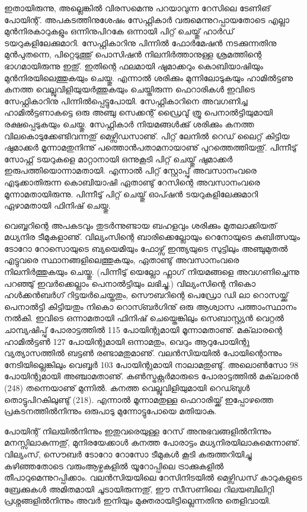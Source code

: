 ഇതായിരുന്നു, അല്ലെങ്കില്‍ വിരസമെന്നു പറയാവുന്ന റേസിലെ ടേണിങ് പോയിന്റ്. അപകടത്തിനുശേഷം സേഫ്റ്റികാര്‍ 
വരുമെന്നുറപ്പായതോടെ എല്ലാ മുന്‍നിരകാറുകളും ഒന്നിനുപിറകേ ഒന്നായി പിറ്റ് ചെയ്തു് ഹാര്‍ഡ് ടയറുകളിലേക്കുമാറി. 
സേഫ്റ്റികാറിനു പിന്നില്‍ ഫോര്‍മേഷന്‍ നടക്കുന്നതിനു മുന്‍പുതന്നെ, പിറ്റെടുത്തു് പൊസിഷന്‍ നിലനിര്‍ത്താനുള്ള 
ശ്രമത്തിന്റെ ഭാഗമായിരുന്നു ഇതു്. ഇതിന്റെ ഫലമായി ഷുമാക്കറും കൊബിയാഷിയും മുന്‍നിരയിലെത്തുകയും ചെയ്തു. 
എന്നാല്‍ ശരിക്കും മുന്നിലോടുകയും ഹാമില്‍ട്ടണു കനത്ത വെല്ലുവിളിയുയര്‍ത്തുകയും ചെയ്തിരുന്ന ഫെറാരികള്‍ ഇവിടെ 
സേഫ്റ്റികാറിനു പിന്നില്‍പ്പെട്ടുപോയി. സേഫ്റ്റികാറിനെ അവഗണിച്ച ഹാമില്‍ട്ടണാകട്ടെ ഒരു അഞ്ചു സെക്കന്റ് ഡ്രൈവു് ത്രൂ 
പെനാല്‍ട്ടിയുമായി രക്ഷപ്പെടുകയും ചെയ്തു. സേഫ്റ്റികാര്‍ നിയമങ്ങള്‍ക്കു് ശരിക്കും കനത്ത വിലകൊടുക്കേണ്ടിവന്നതു് 
മെഴ്സിഡസാണു്. പിറ്റ് ലേനില്‍ റെഡ് ലൈറ്റ് കിട്ടിയ ഷുമാക്കര്‍ മൂന്നാമതുനിന്നു് പത്തൊന്‍പതാമനായാണു് പുറത്തെത്തിയതു്. 
പിന്നീടു് സോഫ്റ്റ് ടയറുകളെ മാറ്റാനായി ഒന്നുകൂടി പിറ്റ് ചെയ്തു് ഷുമാക്കര്‍ ഇരുപത്തിയൊന്നാമതായി. എന്നാല്‍ പിറ്റ് 
സ്റ്റോപ്പു് അവസാനംവരെ എടുക്കാതിരുന്ന കൊബിയാഷി ഏതാണ്ടു് റേസിന്റെ അവസാനംവരെ മൂന്നാമതായിരുന്നു. 
പിന്നീടു് പിറ്റ് ചെയ്തു് ഓപ്ഷന്‍ ടയറുകളിലേക്കുമാറി ഏഴാമതായി ഫിനിഷ് ചെയ്തു.

വെബ്ബറിന്റെ അപകടവും തുടര്‍ന്നുണ്ടായ ബഹളവും ശരിക്കും മുതലാക്കിയത് മധ്യനിര ടീമുകളാണു്. വില്യംസിന്റെ 
ബാരിക്കെല്ലോയും റെനോയുടെ കുബിത്സയും ടോറോ റോസൊയുടെ ബ്യയെമിയും ഫോഴ്സ് ഇന്ത്യയുടെ സുട്ടിലും 
അഞ്ചുമുതല്‍ എട്ടുവരെ സ്ഥാനങ്ങളിലെത്തുകയും, ഏതാണ്ടു് അവസാനംവരെ നിലനിര്‍ത്തുകയും ചെയ്തു. (പിന്നീടു് 
യെല്ലോ ഫ്ലാഗ് നിയമങ്ങളെ അവഗണിച്ചെന്നു പറഞ്ഞു് ഇവര്‍ക്കെല്ലാം പെനാല്‍ട്ടിയും ലഭിച്ചു.) വില്യംസിന്റെ നികൊ 
ഹള്‍ക്കന്‍ബര്‍ഗ് റിട്ടയര്‍ചെയ്തതും, സൌബറിന്റെ പെഡ്രോ ഡി ലാ റൊസയ്ക്കു് പെനാല്‍ട്ടി കിട്ടിയതും നികൊ 
റൊസ്ബര്‍ഗിനു് ഒരു ആശ്വാസ പത്താംസ്ഥാനം നല്‍കി. ഇവിടെ ഒന്നാമതായി ഫിനിഷ് ചെയ്തെങ്കിലും സെബാസ്റ്റ്യന്‍ 
വെറ്റല്‍ ചാമ്പ്യഷിപ്പു് പോരാട്ടത്തില്‍ 115 പോയിന്റുമായി മൂന്നാമതാണു്. മക്‌ലാരന്റെ ഹാമില്‍ട്ടണ്‍ 127 പോയിന്റുമായി 
ഒന്നാമതും, വെറും ആറുപോയിന്റു വ്യത്യാസത്തില്‍ ബട്ടണ്‍ രണ്ടാമതുമാണു്. വലന്‍സിയയില്‍ പോയിന്റൊന്നും 
നേടിയില്ലെങ്കിലും വെബ്ബര്‍ 103 പോയിന്റുമായി നാലാമതുണ്ടു്. അലൊണ്‍സോ 98 പോയിന്റുമായി അഞ്ചാമതാണു്. 
കണ്‍സ്ട്രക്റ്റര്‍മാരുടെ പോരാട്ടത്തില്‍ മക്‌ലാരന്‍ (248) തന്നെയാണു് മുന്നില്‍. കനത്ത വെല്ലുവിളിയുമായി റെഡ്ബുള്‍ 
തൊട്ടുപിറകിലുണ്ടു് (218). എന്നാല്‍ മൂന്നാമതുള്ള ഫെറാരിയ്ക്ക് ഇപ്പോഴത്തെ പ്രകടനത്തില്‍നിന്നും 
ഒരുപാടു മുന്നോട്ടുപോയെ മതിയാകു.

പോയിന്റ് നിലയില്‍നിന്നും ഇതുവരെയുള്ള റേസ് അനുഭവങ്ങളില്‍നിന്നും മനസ്സിലാകുന്നതു്, മുനിരയേക്കാള്‍ കനത്ത 
പോരാട്ടം മധ്യനിരയിലാകുമെന്നാണു്. വില്യംസ്, സൌബര്‍ ടോറോ റോസോ ടീമുകള്‍ കൂടി കരുത്തറിയിച്ചു കഴിഞ്ഞതോടെ
വരുംആഴ്ചകളില്‍ യൂറോപ്പിലെ ട്രാക്കുകളില്‍ തീപാറുമെന്നുറപ്പിക്കാം. വലന്‍സിയയിലെ റേസിനിടയില്‍ മെഴ്സിഡസ് 
കാറുകളുടെ ബ്രേക്കുകള്‍ അമിതമായി ചൂടായിരുന്നതു്, ഈ സീസണിലെ റിലയബിലിറ്റി പ്രശ്നങ്ങളില്‍നിന്നും അവര്‍ ഇനിയും 
മുക്തരായിട്ടില്ലെന്നതിനു തെളിവായി.


